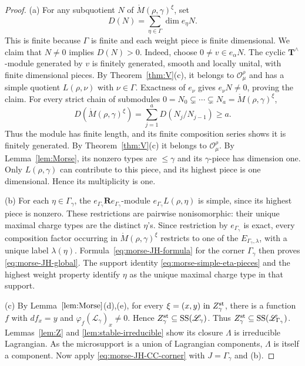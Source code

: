 \documentclass[11pt,reqno]{amsart}
\theoremstyle{definition}
\theoremstyle{remark}
\def\scrO{\mathscr O}
\def\bR{\mathbf R}
\def\bT{\mathbf T}
\begin{document}
\begin{proof}
(a) For any subquotient $N$ of $\mathring M(\rho,\gamma)^\xi$, set
\[
 D(N)=\sum_{\eta\in\Gamma}\dim e_\eta N.
\]
This is finite because $\Gamma$ is finite and each weight piece
is finite dimensional. We claim that $N\ne0$ implies $D(N)>0$.
Indeed, choose $0\ne v\in e_\alpha N$. The cyclic
$\bT^\wedge$-module generated by $v$ is finitely generated,
smooth and locally unital, with finite dimensional pieces.
By Theorem~\ref{thm:V}(c), it belongs to $\scrO_\mu^\rho$ and has
a simple quotient $L(\rho,\nu)$ with $\nu\in\Gamma$.
Exactness of $e_\nu$ gives $e_\nu N\ne0$, proving the claim.
For every strict chain of submodules
$0=N_0\subsetneq\cdots\subsetneq N_a=\mathring M(\rho,\gamma)^\xi$,
\[
 D(\mathring M(\rho,\gamma)^\xi)
 =\sum_{j=1}^a D(N_j/N_{j-1})\geqslant a.
\]
Thus the module has finite length, and its finite composition series
shows it is finitely generated. By Theorem~\ref{thm:V}(c) it
belongs to $\scrO_\mu^\rho$. By Lemma~\ref{lem:Morse}, its nonzero
types are $\leqslant\gamma$ and its $\gamma$-piece has dimension one.
Only $L(\rho,\gamma)$ can contribute to this piece, and its highest
piece is one dimensional. Hence its multiplicity is one.

(b) 
For each $\eta\in\Gamma_\gamma$, the $e_{\Gamma_\gamma}\bR e_{\Gamma_\gamma}$-module 
$e_{\Gamma_\gamma} L(\rho,\eta)$
is simple, since its highest piece is nonzero.
These restrictions are pairwise nonisomorphic: their unique
maximal charge types are the distinct $\eta$'s. Since restriction
by $e_{\Gamma_\gamma}$ is exact, every composition factor occurring in
$\mathring M(\rho,\gamma)^\xi$ restricts to one of the
$E_{\Gamma_\gamma,\lambda}$, with a unique label $\lambda(\eta)$.
Formula~\eqref{eq:morse-JH-formula} for the corner $\Gamma_\gamma$
then proves \eqref{eq:morse-JH-global}. The support identity
\eqref{eq:morse-simple-eta-pieces} and the highest weight property
identify $\eta$ as the unique maximal charge type in that support.

(c) 
By Lemma~\(\ref{lem:Morse}\)(d),(e), for every \(\xi=(x,y)$ in $Z_\gamma^{\rm st}\), there is a function \(f\) with \(df_x=y\) and \(\varphi_f(\mathscr L_\gamma)_x\ne0\). Hence \(Z_\gamma^{\rm st}\subseteq\operatorname{SS}(\mathscr L_\gamma)\).
Thus $Z_\gamma^{\rm st}\subseteq\operatorname{SS}(\mathscr L_{\Gamma_\gamma})$.
Lemmas~\ref{lem:Z} and \ref{lem:stable-irreducible}
show its closure $\Lambda$ is irreducible Lagrangian.
As the microsupport is a union of Lagrangian components,
$\Lambda$ is itself a component. Now apply
\eqref{eq:morse-JH-CC-corner} with $J=\Gamma_\gamma$ and (b).
\end{proof}
\end{document}
